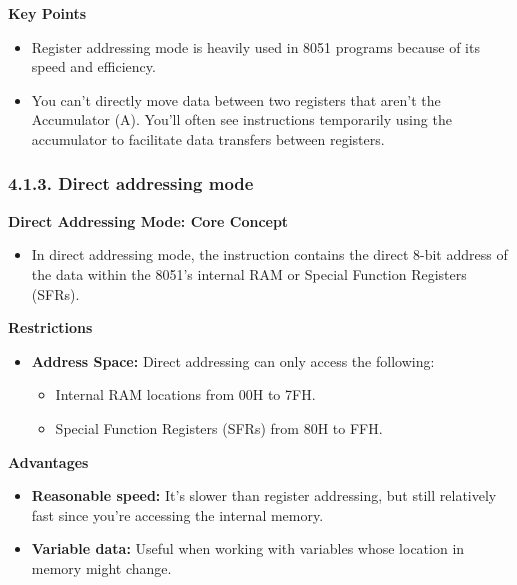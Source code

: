 \documentclass[
]{article}
\begin{document}
\textbf{Key Points}

\begin{itemize}
\item
  Register addressing mode is heavily used in 8051 programs because of
  its speed and efficiency.
\item
  You can't directly move data between two registers that aren't the
  Accumulator (A). You'll often see instructions temporarily using the
  accumulator to facilitate data transfers between registers.
\end{itemize}

\hypertarget{413-direct-addressing-mode}{%
\subsubsection{4.1.3. Direct addressing
mode}\label{413-direct-addressing-mode}}

\textbf{Direct Addressing Mode: Core Concept}

\begin{itemize}
\item
  In direct addressing mode, the instruction contains the direct 8-bit
  address of the data within the 8051's internal RAM or Special Function
  Registers (SFRs).
\end{itemize}

\textbf{Restrictions}

\begin{itemize}
\item
  \textbf{Address Space:} Direct addressing can only access the
  following:

  \begin{itemize}
  \item
    Internal RAM locations from 00H to 7FH.
  \item
    Special Function Registers (SFRs) from 80H to FFH.
  \end{itemize}
\end{itemize}

\textbf{Advantages}

\begin{itemize}
\item
  \textbf{Reasonable speed:} It's slower than register addressing, but
  still relatively fast since you're accessing the internal memory.
\item
  \textbf{Variable data:} Useful when working with variables whose
  location in memory might change.
\end{itemize}
\end{document}
